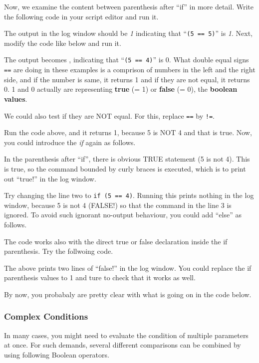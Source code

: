 \documentclass[11pt,a4paper,oneside]{report}
\newcommand{\ilcom}[1]{\texttt{\small#1}}
\begin{document}
Now, we examine the content between 
parenthesis after ``if'' in more detail. 
Write the following code in your script editor and run it.

The output in the log window should be \textit{1} indicating that ``\ilcom{(5 ==
5)}'' is \textit{1}. Next, modify the code like below and run it.

The output becomes , indicating that ``\ilcom{(5 == 4)}'' is
0.
What double equal signs \ilcom{==} are doing in these
examples is a comprison of numbers in the left and the right side, and if
the number is same, it returns 1 and if they are not equal, it returns 0. 1 and
0 actually are representing \textbf{true} (= 1) or \textbf{false} (= 0), the
\textbf{boolean values}.

We could also test if they are NOT equal. For this, replace \ilcom{==} by
\ilcom{!=}.

Run the code above, and it returns 1, because 5 is NOT 4 and that is true. Now,
you could introduce the \textit{if} again as follows.

In the parenthesis after ``if'', there is obvious TRUE statement (5 is not 4).
This is true, so the command bounded by curly braces is executed, which is to
print out ``true!'' in the log window.

Try changing the line two to \ilcom{if (5 == 4)}. Running this prints nothing
in the log window, because 5 is not 4 (FALSE!) so that the command in
the line 3 is ignored. To avoid such ignorant no-output behaviour, you could add
``else'' as follows.



The code works also with the direct true or false
declaration inside the if parenthesis. Try the follwoing code.



The above prints two lines of ``false!'' in the log window. You could replace
the if parenthesis values to 1 and ture to check that it works as well. 

By now, you probabaly are pretty clear with what is going on in the code below. 


\subsubsection{Complex Conditions}
In many cases, you might need to evaluate the condition of multiple parameters at once. 
For such demands, several different comparisons can be combined by using following Boolean operators. 
\end{document}
